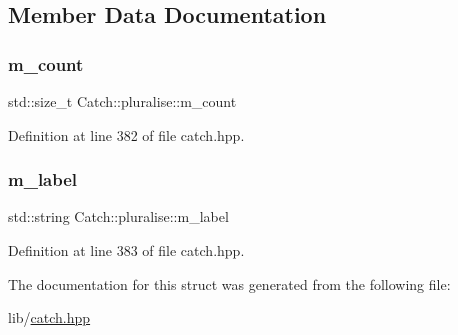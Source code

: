 \subsection{Member Data Documentation}
\hypertarget{struct_catch_1_1pluralise_a4dce2fa13ec6f00fac09b2418265441e}{}\label{struct_catch_1_1pluralise_a4dce2fa13ec6f00fac09b2418265441e} 
\subsubsection{\texorpdfstring{m\+\_\+count}{m\_count}}
{\footnotesize\ttfamily std\+::size\+\_\+t Catch\+::pluralise\+::m\+\_\+count}



Definition at line 382 of file catch.\+hpp.

\hypertarget{struct_catch_1_1pluralise_a8849cbdd3f11ebe7747597c8644e8793}{}\label{struct_catch_1_1pluralise_a8849cbdd3f11ebe7747597c8644e8793} 
\subsubsection{\texorpdfstring{m\+\_\+label}{m\_label}}
{\footnotesize\ttfamily std\+::string Catch\+::pluralise\+::m\+\_\+label}



Definition at line 383 of file catch.\+hpp.



The documentation for this struct was generated from the following file\+:\begin{DoxyCompactItemize}
\item 
lib/\hyperlink{catch_8hpp}{catch.\+hpp}\end{DoxyCompactItemize}
